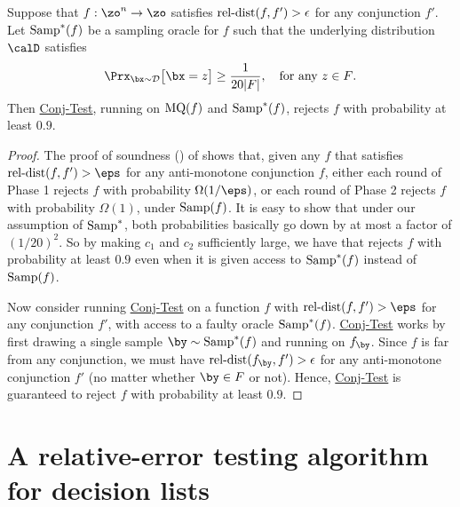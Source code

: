 \documentclass[11pt]{article}
\theoremstyle{definition}
\begin{document}
\begin{theorem}\label{thm: reject weaker assumption}
    Suppose that $f: \zo^n \to \zo$ satisfies $\mathrm{rel}\text{-}\mathrm{dist}(f,f') > \epsilon$ for any conjunction $f'$. Let $\mathrm{Samp}^\ast(f)$ be a sampling oracle for $f$ such that the underlying distribution 
    $\calD$ satisfies
\[\Prx_{\bx \sim {\cal D}}\big[\bx = z\big] \geq \frac{1}{20|F|},\quad\text{for any $z\in F$}.\]
Then \hyperlink{Algorithm2}{\sc Conj-Test}, running on $\mathrm{MQ}(f)$ and $\mathrm{Samp}^*(f)$,
rejects $f$ with probability at least $0.9$.
\end{theorem}
\begin{proof}
The proof of soundness
  () of  shows that, given any $f$ that satisfies
  $\reldist(f,f')>\eps$ for any anti-monotone conjunction $f$,
  either each round of Phase 1 rejects $f$ with probability $\Omega(1/\eps)$,
  or each round of Phase 2 rejects $f$ with probability $\Omega(1)$,
  under $\mathrm{Samp}(f)$.
It is easy to show that under our assumption of $\mathrm{Samp}^*$,
  both probabilities basically go down by at most a factor of $(1/20)^2$.
So by making $c_1$ and $c_2$ sufficiently large, we have that 
   rejects $f$ with probability at least $0.9$
  even when it is given access to $\mathrm{Samp}^*(f)$ instead of $\mathrm{Samp}(f)$.
  




Now consider running \hyperlink{Algorithm2}{\sc Conj-Test} on a function $f$
  with $\reldist(f,f')>\eps$ for any conjunction $f'$, with access to a faulty oracle
  $\mathrm{Samp}^*(f)$.    
\hyperlink{Algorithm2}{\sc Conj-Test} works by first drawing a single sample $\by \sim \SAMP^*(f)$ and running  on $f_{{\by}}$. Since $f$ is far from any conjunction, we must have $\reldist(f_{{\by}},f')>\epsilon$ for any anti-monotone conjunction $f'$ {(no matter whether $\by\in F$ or not)}. Hence, \hyperlink{Algorithm2}{\sc Conj-Test} is guaranteed to reject $f $ with probability at least $0.9$.
\end{proof}

    








 

\section{A relative-error testing algorithm for decision lists} \label{sec:DL}
\end{document}
